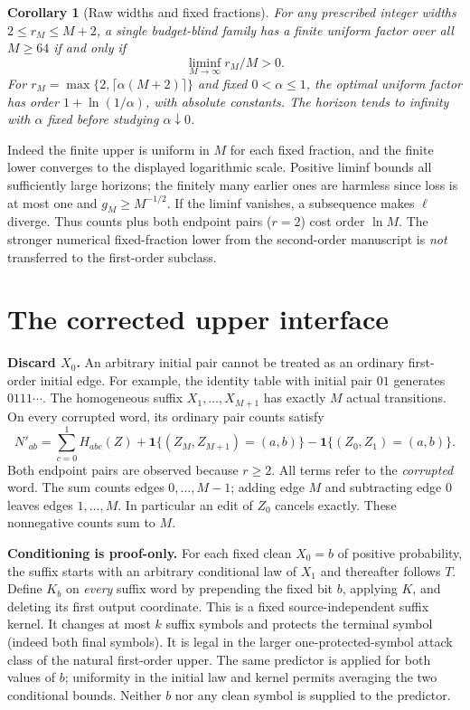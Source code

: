 \documentclass[10pt]{article}
\newtheorem{corollary}[theorem]{Corollary}
\newcommand{\ind}{\mathbf1}
\begin{document}
\begin{corollary}[Raw widths and fixed fractions]
For any prescribed integer widths $2\le r_M\le M+2$, a single budget-blind family has a finite uniform factor over all $M\ge64$ if and only if
\[
 \liminf_{M\to\infty}r_M/M>0.
\]
For $r_M=\max\{2,\lceil\alpha(M+2)\rceil\}$ and fixed $0<\alpha\le1$, the optimal uniform factor has order $1+\ln(1/\alpha)$, with absolute constants. The horizon tends to infinity with $\alpha$ fixed before studying $\alpha\downarrow0$.
\end{corollary}
Indeed the finite upper is uniform in $M$ for each fixed fraction, and the finite lower converges to the displayed logarithmic scale. Positive liminf bounds all sufficiently large horizons; the finitely many earlier ones are harmless since loss is at most one and $g_M\ge M^{-1/2}$. If the liminf vanishes, a subsequence makes $\ell$ diverge. Thus counts plus both endpoint pairs ($r=2$) cost order $\ln M$. The stronger numerical fixed-fraction lower from the second-order manuscript is \emph{not} transferred to the first-order subclass.
\newpage
\section{The corrected upper interface}
\textbf{Discard $X_0$.} An arbitrary initial pair cannot be treated as an ordinary first-order initial edge. For example, the identity table with initial pair $01$ generates $0111\cdots$. The homogeneous suffix $X_1,\ldots,X_{M+1}$ has exactly $M$ actual transitions. On every corrupted word, its ordinary pair counts satisfy
\begin{equation}\label{eq:counts}
 N'_{ab}=\sum_{c=0}^1 H_{abc}(Z)
 +\ind\{(Z_M,Z_{M+1})=(a,b)\}
 -\ind\{(Z_0,Z_1)=(a,b)\}.
\end{equation}
Both endpoint pairs are observed because $r\ge2$. All terms refer to the \emph{corrupted} word. The sum counts edges $0,\ldots,M-1$; adding edge $M$ and subtracting edge $0$ leaves edges $1,\ldots,M$. In particular an edit of $Z_0$ cancels exactly. These nonnegative counts sum to $M$.

\textbf{Conditioning is proof-only.} For each fixed clean $X_0=b$ of positive probability, the suffix starts with an arbitrary conditional law of $X_1$ and thereafter follows $T$. Define $K_b$ on \emph{every} suffix word by prepending the fixed bit $b$, applying $K$, and deleting its first output coordinate. This is a fixed source-independent suffix kernel. It changes at most $k$ suffix symbols and protects the terminal symbol (indeed both final symbols). It is legal in the larger one-protected-symbol attack class of the natural first-order upper. The same predictor is applied for both values of $b$; uniformity in the initial law and kernel permits averaging the two conditional bounds. Neither $b$ nor any clean symbol is supplied to the predictor.
\end{document}
